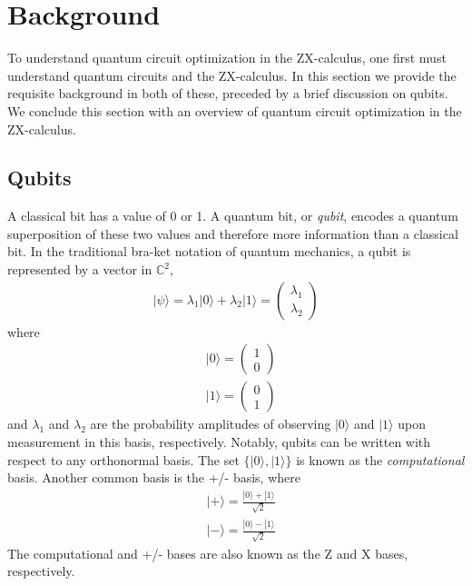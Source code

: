 \chapter[Background]{Background} \label{ch:bg}


To understand quantum circuit optimization in the ZX-calculus, one first must understand quantum circuits and the ZX-calculus.
In this section we provide the requisite background in both of these, preceded by a brief discussion on qubits.
We conclude this section with an overview of quantum circuit optimization in the ZX-calculus.

\section{Qubits}\label{sec:qubits}

A classical bit has a value of 0 or 1.
A quantum bit, or \emph{qubit}, encodes a quantum superposition of these two values and therefore more information than a classical bit.
In the traditional bra-ket notation of quantum mechanics, a qubit is represented by a vector in $\mathbb{C}^2$,
\begin{align*}
  |\psi\rangle = \lambda_1 |0\rangle + \lambda_2 |1\rangle = \begin{pmatrix}\lambda_1 \\ \lambda_2 \end{pmatrix}
\end{align*}
where
\begin{align*}
  & |0\rangle = \begin{pmatrix}1 \\ 0\end{pmatrix} \\
  & |1\rangle = \begin{pmatrix}0 \\ 1\end{pmatrix}
\end{align*}
and $\lambda_1$ and $\lambda_2$ are the probability amplitudes of observing $|0\rangle$ and $|1\rangle$ upon measurement in this basis, respectively.
Notably, qubits can be written with respect to any orthonormal basis.
The set $\{|0\rangle, |1\rangle\}$ is known as the \emph{computational} basis.
Another common basis is the +/- basis, where
\begin{align*}
  & |+\rangle = \frac{|0\rangle + |1\rangle}{\sqrt{2}} \\
  & |-\rangle = \frac{|0\rangle - |1\rangle}{\sqrt{2}}
\end{align*}
The computational and +/- bases are also known as the Z and X bases, respectively.

